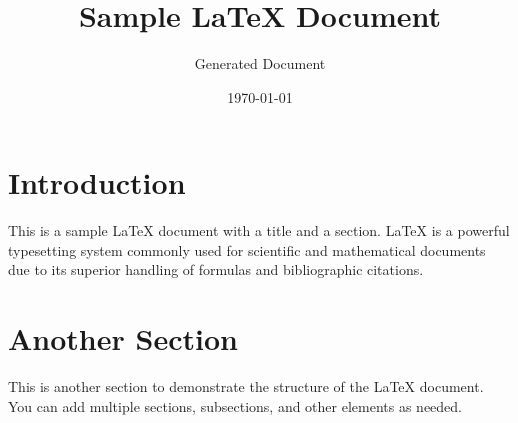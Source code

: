 \documentclass{article}
\title{Sample LaTeX Document}
\author{Generated Document}
\date{\today}
\begin{document}
\maketitle

\section{Introduction}
This is a sample LaTeX document with a title and a section. LaTeX is a powerful typesetting system commonly used for scientific and mathematical documents due to its superior handling of formulas and bibliographic citations.

\section{Another Section}
This is another section to demonstrate the structure of the LaTeX document. You can add multiple sections, subsections, and other elements as needed.
\end{document}
